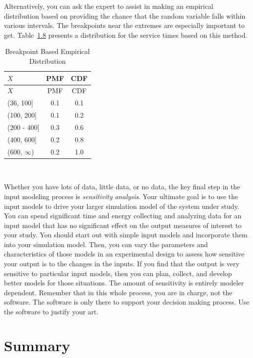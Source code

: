 \documentclass[
]{book}
\theoremstyle{definition}
\theoremstyle{definition}
\theoremstyle{definition}
\theoremstyle{definition}
\theoremstyle{remark}
\begin{document}
Alternatively, you can ask the expert to assist in making an empirical
distribution based on providing the chance that the random variable
falls within various intervals. The breakpoints near the extremes are
especially important to get.
Table~\protect\hyperlink{Table:5-9}{1.8}
presents a distribution for the service times based on this method.

\hypertarget{Table:5-9}{}
\begin{longtable}[]{@{}lcc@{}}
\caption{Breakpoint Based Empirical Distribution}\tabularnewline
\toprule
\(X\) & PMF & CDF \\
\midrule
\endfirsthead
\toprule
\(X\) & PMF & CDF \\
\midrule
\endhead
(36, 100{]} & 0.1 & 0.1 \\
(100, 200{]} & 0.1 & 0.2 \\
(200 - 400{]} & 0.3 & 0.6 \\
(400, 600{]} & 0.2 & 0.8 \\
(600, \(\infty\)) & 0.2 & 1.0 \\
\bottomrule
\end{longtable}

~

Whether you have lots of data, little data, or no data, the key final
step in the input modeling process is \emph{sensitivity analysis}. Your
ultimate goal is to use the input models to drive your larger simulation
model of the system under study. You can spend significant time and
energy collecting and analyzing data for an input model that has no
significant effect on the output measures of interest to your study. You
should start out with simple input models and incorporate them into your
simulation model. Then, you can vary the parameters and characteristics
of those models in an experimental design to assess how sensitive your
output is to the changes in the inputs. If you find that the output is
very sensitive to particular input models, then you can plan, collect,
and develop better models for those situations. The amount of
sensitivity is entirely modeler dependent. Remember that in this whole
process, you are in charge, not the software. The software is only there
to support your decision making process. Use the software to justify
your art.

\hypertarget{app:idmSummary}{%
\section{Summary}\label{app:idmSummary}}
\end{document}
